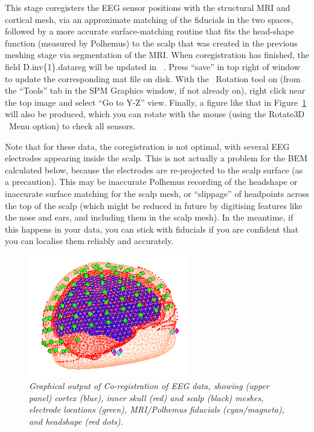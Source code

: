 This stage coregisters the EEG sensor positions with the structural MRI and cortical mesh, via an approximate matching of the fiducials in the two spaces, followed by a more accurate surface-matching routine that fits the head-shape function (measured by Polhemus) to the scalp that was created in the previous meshing stage via segmentation of the MRI. When coregistration has finished, the field D.inv\{1\}.datareg will be updated in \matlab\ . Press ``save'' in top right of window to update the corresponding mat file on disk. With the \matlab\ Rotation tool on (from the ``Tools'' tab in the SPM Graphics window, if not already on), right click near the top image and select ``Go to Y-Z'' view. Finally, a figure like that in Figure~\ref{multimodal:fig:8} will also be produced, which you can rotate with the mouse (using the Rotate3D \matlab\ Menu option) to check all sensors.

Note that for these data, the coregistration is not optimal, with several EEG electrodes appearing inside the scalp. This is not actually a problem for the BEM calculated below, because the electrodes are re-projected to the scalp surface (as a precaution). This may be inaccurate Polhemus recording of the headshape or inaccurate surface matching for the scalp mesh, or ``slippage'' of headpoints across the top of the scalp (which might be reduced in future by digitising features like the nose and ears, and including them in the scalp mesh). In the meantime, if this happens in your data, you can stick with fiducials if you are confident that you can localise them reliably and accurately.

\begin{figure}
\begin{center}
\includegraphics[width=70mm]{multimodal/figures/eeg_coreg.png}
\caption{\em  Graphical output of Co-registration of EEG data, showing (upper panel) cortex (blue), inner skull (red) and scalp (black) meshes, electrode locations (green), MRI/Polhemus fiducials (cyan/magneta), and headshape (red dots).\label{multimodal:fig:8}}
\end{center}
\end{figure}

